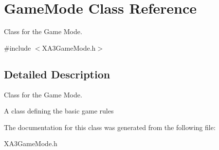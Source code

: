 \hypertarget{class_game_mode}{}\section{Game\+Mode Class Reference}
\label{class_game_mode}


Class for the Game Mode.  




{\ttfamily \#include $<$X\+A3\+Game\+Mode.\+h$>$}



\subsection{Detailed Description}
Class for the Game Mode. 

A class defining the basic game rules 

The documentation for this class was generated from the following file\+:\begin{DoxyCompactItemize}
\item 
X\+A3\+Game\+Mode.\+h\end{DoxyCompactItemize}
